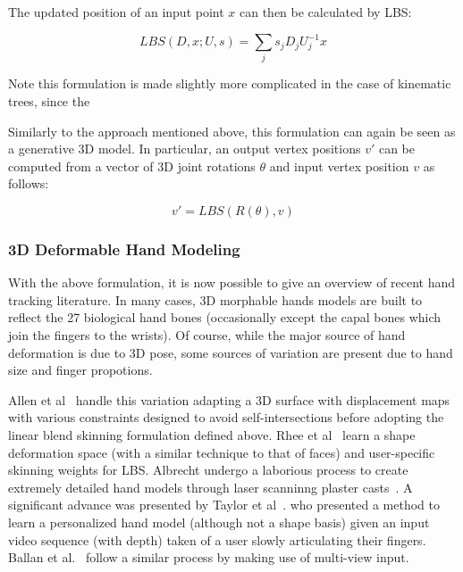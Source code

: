 The updated position of an input point $x$ can then be calculated by LBS:

\begin{equation}
    LBS(D, x; U, s) = \sum_{j}s_{j}D_{j}U_{j}^{-1}x
\end{equation}

Note this formulation is made slightly more complicated in the case of kinematic trees, since the 

Similarly to the approach mentioned above, this formulation can again be seen as a generative 3D model. In particular, an output vertex positions $v'$ can be computed from a vector of 3D joint rotations $\theta$ and input vertex position $v$ as follows:

\begin{equation}
    v' = LBS(R(\theta), v)
\end{equation}

\subsubsection{3D Deformable Hand Modeling}

With the above formulation, it is now possible to give an overview of recent hand tracking literature. In many cases, 3D morphable hands models are built to reflect the 27 biological hand bones (occasionally except the capal bones which join the fingers to the wrists). Of course, while the major source of hand deformation is due to 3D pose, some sources of variation are present due to hand size and finger propotions.

Allen et al~\cite{xxx} handle this variation adapting a 3D surface with displacement maps with various constraints designed to avoid self-intersections before adopting the linear blend skinning formulation defined above. Rhee et al~\cite{xxx} learn a shape deformation space (with a similar technique to that of faces) and user-specific skinning weights for LBS. Albrecht undergo a laborious process to create extremely detailed hand models through laser scanninng plaster casts~\cite{xxx}. A significant advance was presented by Taylor et al~\cite{xxx}. who presented a method to learn a personalized hand model (although not a shape basis) given an input video sequence (with depth) taken of a user slowly articulating their fingers. Ballan et al.~\cite{xxx} follow a similar process by making use of multi-view input. 



